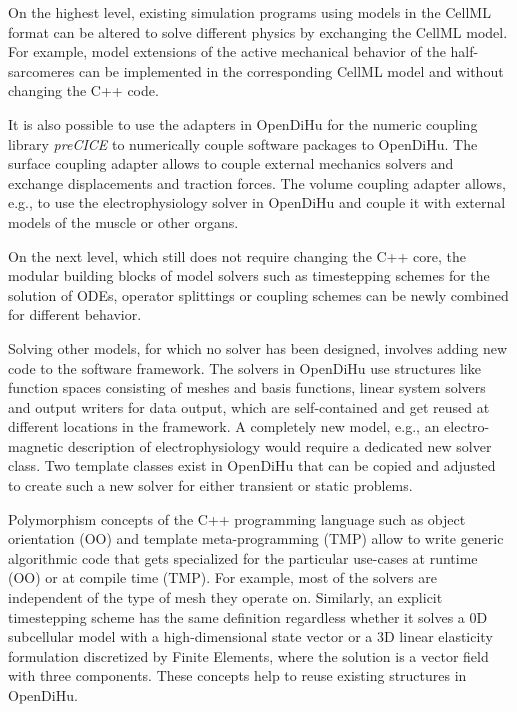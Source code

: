On the highest level, existing simulation programs using models in the CellML format can be altered to solve different physics by exchanging the CellML model. For example, model extensions of the active mechanical behavior of the half-sarcomeres can be implemented in the corresponding CellML model and without changing the C++ code.

It is also possible to use the adapters in OpenDiHu for the numeric coupling library \emph{preCICE} \cite{precice} to numerically couple  software packages to OpenDiHu. The surface coupling adapter allows to couple external mechanics solvers and exchange displacements and traction forces. The volume coupling adapter allows, e.g., to use the electrophysiology solver in OpenDiHu and couple it with external models of the muscle or other organs.

On the next level, which still does not require changing the C++ core, the modular building blocks of model solvers such as timestepping schemes for the solution of ODEs, operator splittings or coupling schemes can be newly combined for different behavior.

Solving other models, for which no solver has been designed, involves adding new code to the software framework.
The solvers in OpenDiHu use structures like function spaces consisting of meshes and basis functions, linear system solvers and output writers for data output, which are self-contained and get reused at different locations in the framework. A completely new model, e.g., an electro-magnetic description of electrophysiology would require a dedicated new solver class. 
Two template classes exist in OpenDiHu that can be copied and adjusted to create such a new solver for either transient or static problems.

Polymorphism concepts of the C++ programming language such as object orientation (OO) and template meta-programming (TMP) allow to write generic algorithmic code that gets specialized for the particular use-cases at runtime (OO) or at compile time (TMP). For example, most of the solvers are independent of the type of mesh they operate on. Similarly, an explicit timestepping scheme has the same definition regardless whether it solves a 0D subcellular model with a high-dimensional state vector or a 3D linear elasticity formulation discretized by Finite Elements, where the solution is a vector field with three components.
These concepts help to reuse existing structures in OpenDiHu.


